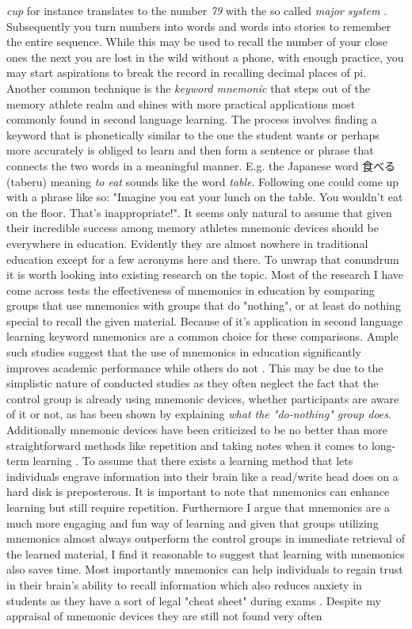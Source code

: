 \emph{cup} for instance translates to the number \emph{79} with the so called \emph{major system} \cite{major_system}. Subsequently you turn numbers into words and words into stories to remember the entire sequence. While this may be used to recall the number of your close ones the next you are lost in the wild without a phone, with enough practice, you may start aspirations to break the record in recalling decimal places of pi. Another common technique is the \emph{keyword mnemonic} that steps out of the memory athlete realm and shines with more practical applications most commonly found in second language learning. The process involves finding a keyword that is phonetically similar to the one the student wants or perhaps more accurately is obliged to learn and then form a sentence or phrase that connects the two words in a meaningful manner. E.g. the Japanese word 食べる (taberu) meaning \emph{to eat} sounds like the word \emph{table}. Following one could come up with a phrase like so: "Imagine you eat your lunch on the table. You wouldn't eat on the floor. That's inappropriate!". It seems only natural to assume that given their incredible success among memory athletes mnemonic devices should be everywhere in education. Evidently they are almost nowhere in traditional education except for a few acronyms here and there. To unwrap that conundrum it is worth looking into existing research on the topic. Most of the research I have come across tests the effectiveness of mnemonics in education by comparing groups that use mnemonics with groups that do "nothing", or at least do nothing special to recall the given material. Because of it's application in second language learning keyword mnemonics are a common choice for these comparisons. Ample such studies suggest that the use of mnemonics in education significantly improves academic performance while others do not \cite{putnam_2015}. This may be due to the simplistic nature of conducted studies as they often neglect the fact that the control group is already using mnemonic devices, whether participants are aware of it or not, as has been shown by \cite{the_do_nothing_group} explaining \emph{what the "do-nothing" group does}. Additionally mnemonic devices have been criticized to be no better than more straightforward methods like repetition and taking notes when it comes to long-term learning \cite{putnam_2015}. To assume that there exists a learning method that lets individuals engrave information into their brain like a read/write head does on a hard disk is preposterous. It is important to note that mnemonics can enhance learning but still require repetition. Furthermore I argue that mnemonics are a much more engaging and fun way of learning and given that groups utilizing mnemonics almost always outperform the control groups in immediate retrieval \cite{putnam_2015} of the learned material, I find it reasonable to suggest that learning with mnemonics also saves time. Most importantly mnemonics can help individuals to regain trust in their brain's ability to recall information which also reduces anxiety in students as they have a sort of legal "cheat sheet" during exams \cite{putnam_2015}. Despite my appraisal of mnemonic devices they are still not found very often 